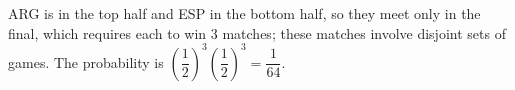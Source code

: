 ARG is in the top half and ESP in the bottom half, so they meet only in the final, which requires each to win $3$ matches; these matches involve disjoint sets of games. The probability is $\left(\dfrac12\right)^3\left(\dfrac12\right)^3=\boxed{\dfrac1{64}}$.
